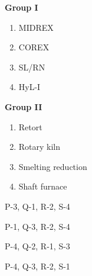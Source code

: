 \documentclass[journal,12pt,onecolumn]{IEEEtran}
\theoremstyle{remark}
\begin{document}
\begin{enumerate}
    \begin{minipage}{0.45\textwidth}
    \textbf{Group I}
    \vspace{-6pt}
    \begin{enumerate}
    \item[P.] MIDREX
    \item[Q.] COREX
    \item[R.] SL/RN
    \item[S.] HyL-I
    \end{enumerate}
    \end{minipage}%
    \hfill
    \begin{minipage}{0.45\textwidth}
    \textbf{Group II}
    \vspace{-6pt}
    \begin{enumerate}
    \item[1.] Retort
    \item[2.] Rotary kiln
    \item[3.] Smelting reduction
    \item[4.] Shaft furnace
    \end{enumerate}
    \end{minipage}
    \hfill{}
    \begin{enumerate}[label=(\Alph*)]
    \begin{multicols}{2}
    \item P-3, Q-1, R-2, S-4
    \item P-1, Q-3, R-2, S-4
    \item P-4, Q-2, R-1, S-3
    \item P-4, Q-3, R-2, S-1
    \end{multicols}
    \end{enumerate}


\end{enumerate}
\end{document}

